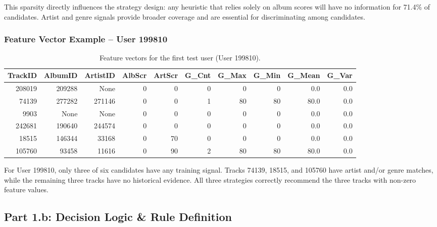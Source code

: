 \documentclass[12pt]{article}
\begin{document}
This sparsity directly influences the strategy design: any heuristic that relies solely on album scores will have no information for 71.4\% of candidates. Artist and genre signals provide broader coverage and are essential for discriminating among candidates.

\subsubsection{Feature Vector Example -- User 199810}

\begin{table}[H]
	\centering
	\footnotesize
	\begin{tabular}{r r r r r r r r r r}
		\toprule
		\textbf{TrackID} & \textbf{AlbumID} & \textbf{ArtistID} & \textbf{AlbScr} & \textbf{ArtScr} & \textbf{G\_Cnt} & \textbf{G\_Max} & \textbf{G\_Min} & \textbf{G\_Mean} & \textbf{G\_Var} \\
		\midrule
		208019 & 209288 & None & 0  & 0  & 0 & 0  & 0  & 0.0  & 0.0  \\
		74139  & 277282 & 271146 & 0  & 0  & 1 & 80 & 80 & 80.0 & 0.0  \\
		9903   & None   & None   & 0  & 0  & 0 & 0  & 0  & 0.0  & 0.0  \\
		242681 & 190640 & 244574 & 0  & 0  & 0 & 0  & 0  & 0.0  & 0.0  \\
		18515  & 146344 & 33168  & 0  & 70 & 0 & 0  & 0  & 0.0  & 0.0  \\
		105760 & 93458  & 11616  & 0  & 90 & 2 & 80 & 80 & 80.0 & 0.0  \\
		\bottomrule
	\end{tabular}
	\caption{Feature vectors for the first test user (User 199810).}\label{tab:example}
\end{table}

For User 199810, only three of six candidates have any training signal. Tracks 74139, 18515, and 105760 have artist and/or genre matches, while the remaining three tracks have no historical evidence. All three strategies correctly recommend the three tracks with non-zero feature values.

\newpage
\subsection{Part 1.b: Decision Logic \& Rule Definition}
\end{document}

